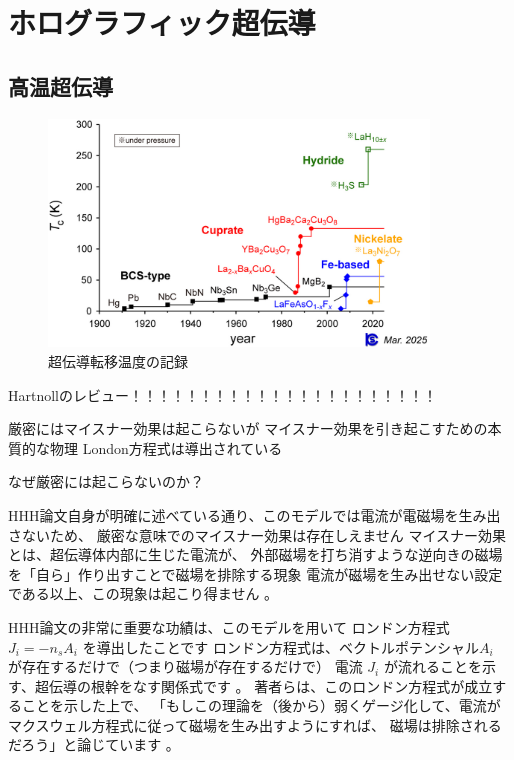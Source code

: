 \documentclass[b5paper,11pt,dvipdfmx]{jsarticle}
\numberwithin{equation}{section}
\theoremstyle{definition}
\begin{document}
\section{ホログラフィック超伝導}

\subsection{高温超伝導}
\begin{figure}[t]
    \centering
    \includegraphics[width=0.9\textwidth]{tc-history_2025.jpg}
    \caption{超伝導転移温度の記録}
    \label{fig:tc-history}
\end{figure}

Hartnollのレビュー！！！！！！！！！！！！！！！！！！！！！！

厳密にはマイスナー効果は起こらないが
マイスナー効果を引き起こすための本質的な物理
London方程式は導出されている

なぜ厳密には起こらないのか？

HHH論文自身が明確に述べている通り、このモデルでは電流が電磁場を生み出さないため、
厳密な意味でのマイスナー効果は存在しえません
マイスナー効果とは、超伝導体内部に生じた電流が、
外部磁場を打ち消すような逆向きの磁場を「自ら」作り出すことで磁場を排除する現象
電流が磁場を生み出せない設定である以上、この現象は起こり得ません 。

HHH論文の非常に重要な功績は、このモデルを用いて
ロンドン方程式 $J_i = -n_s A_i$ を導出したことです
ロンドン方程式は、ベクトルポテンシャル$A_i$ が存在するだけで（つまり磁場が存在するだけで）
電流 $J_i$ が流れることを示す、超伝導の根幹をなす関係式です 。
著者らは、このロンドン方程式が成立することを示した上で、
「もしこの理論を（後から）弱くゲージ化して、電流がマクスウェル方程式に従って磁場を生み出すようにすれば、
磁場は排除されるだろう」と論じています 。
\end{document}

